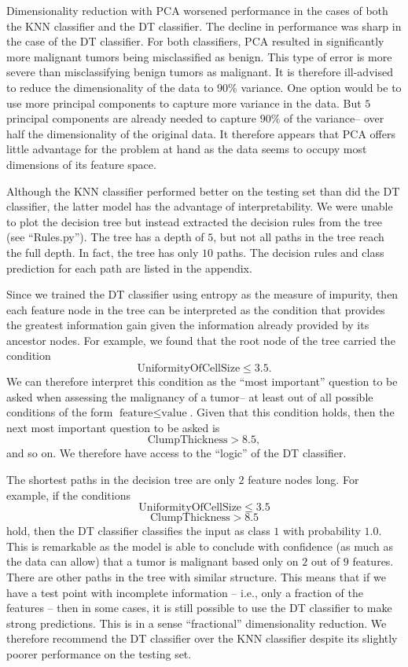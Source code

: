\documentclass[12pt]{article}
\begin{document}
Dimensionality reduction with PCA worsened performance in the cases of both the KNN classifier and the DT classifier. The decline in performance was sharp in the case of the DT classifier. For both classifiers, PCA resulted in significantly more malignant tumors being misclassified as benign. This type of error is more severe than misclassifying benign tumors as malignant. It is therefore ill-advised to reduce the dimensionality of the data to $90\%$ variance. One option would be to use more principal components to capture more variance in the data. But $5$ principal components are already needed to capture $90\%$ of the variance-- over half the dimensionality of the original data. It therefore appears that PCA offers little advantage for the problem at hand as the data seems to occupy most dimensions of its feature space.

Although the KNN classifier performed better on the testing set than did the DT classifier, the latter model has the advantage of interpretability. We were unable to plot the decision tree but instead extracted the decision rules from the tree (see ``Rules.py''). The tree has a depth of $5$, but not all paths in the tree reach the full depth. In fact, the tree has only $10$ paths. The decision rules and class prediction for each path are listed in the appendix.

Since we trained the DT classifier using entropy as the measure of impurity, then each feature node in the tree can be interpreted as the condition that provides the greatest information gain given the information already provided by its ancestor nodes. For example, we found that the root node of the tree carried the condition
\[ \mbox{UniformityOfCellSize} \leq 3.5. \]
We can therefore interpret this condition as the ``most important'' question to be asked when assessing the malignancy of a tumor-- at least out of all possible conditions of the form $\mbox{feature} \leq \mbox{value}$. Given that this condition holds, then the next most important question to be asked is
\[ \mbox{ClumpThickness} > 8.5, \]
and so on. We therefore have access to the ``logic'' of the DT classifier.

The shortest paths in the decision tree are only $2$ feature nodes long. For example, if the conditions
\[ \mbox{UniformityOfCellSize} \leq 3.5 \]
\[ \mbox{ClumpThickness} > 8.5 \]
hold, then the DT classifier classifies the input as class $1$ with probability $1.0$. This is remarkable as the model is able to conclude with confidence (as much as the data can allow) that a tumor is malignant based only on $2$ out of $9$ features. There are other paths in the tree with similar structure. This means that if we have a test point with incomplete information -- i.e., only a fraction of the features -- then in some cases, it is still possible to use the DT classifier to make strong predictions. This is in a sense ``fractional'' dimensionality reduction. We therefore recommend the DT classifier over the KNN classifier despite its slightly poorer performance on the testing set.
\end{document}
